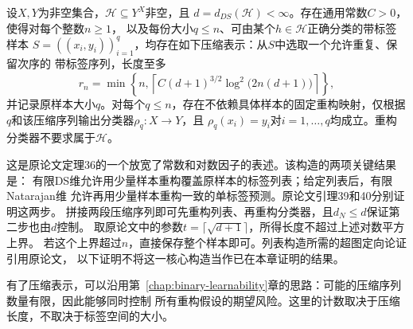 \begin{lemma}[有限DS维的压缩构造]
\label{lem:finite-ds-compression}
设$X,Y$为非空集合，$\mathcal H\subseteq Y^X$非空，且
$d=d_{DS}(\mathcal H)<\infty$。存在通用常数$C>0$，使得对每个整数$n\geq1$，
以及每份大小$q\leq n$、可由某个$h\in\mathcal H$正确分类的带标签样本
$S=((x_i,y_i))_{i=1}^q$，均存在如下压缩表示：从$S$中选取一个允许重复、保留次序的
带标签序列，长度至多
\[
 r_n=\min\!\left\{n,\left\lceil
 C(d+1)^{3/2}\log^2\!\bigl(2n(d+1)\bigr)\right\rceil\right\},
\]
并记录原样本大小$q$。对每个$q\leq n$，存在不依赖具体样本的固定重构映射，仅根据
$q$和该压缩序列输出分类器$\rho_q:X\to Y$，且
$\rho_q(x_i)=y_i$对$i=1,\ldots,q$均成立。重构分类器不要求属于$\mathcal H$。
\end{lemma}

这是原论文定理36的一个放宽了常数和对数因子的表述。该构造的两项关键结果是：
有限DS维允许用少量样本重构覆盖原样本的标签列表；给定列表后，有限Natarajan维
允许再用少量样本重构一致的单标签预测。原论文引理39和40分别证明这两步。
拼接两段压缩序列即可先重构列表、再重构分类器，且$d_N\leq d$保证第二步也由$d$控制。
取原论文中的参数$t=\lceil\sqrt{d+1}\rceil$，所得长度不超过上述对数平方上界。
若这个上界超过$n$，直接保存整个样本即可。列表构造所需的超图定向论证引用原论文，
以下证明不将这一核心构造当作已在本章证明的结果。

有了压缩表示，可以沿用第~\ref{chap:binary-learnability}章的思路：可能的压缩序列数量有限，因此能够同时控制
所有重构假设的期望风险。这里的计数取决于压缩长度，不取决于标签空间的大小。

